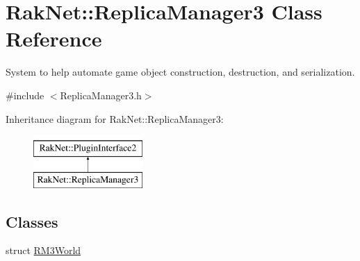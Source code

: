 \hypertarget{class_rak_net_1_1_replica_manager3}{\section{Rak\-Net\-:\-:Replica\-Manager3 Class Reference}
\label{class_rak_net_1_1_replica_manager3}
}


System to help automate game object construction, destruction, and serialization.  




{\ttfamily \#include $<$Replica\-Manager3.\-h$>$}

Inheritance diagram for Rak\-Net\-:\-:Replica\-Manager3\-:\begin{figure}[H]
\begin{center}
\leavevmode
\includegraphics[height=2.000000cm]{class_rak_net_1_1_replica_manager3}
\end{center}
\end{figure}
\subsection*{Classes}
\begin{DoxyCompactItemize}
\item 
struct \hyperlink{struct_rak_net_1_1_replica_manager3_1_1_r_m3_world}{R\-M3\-World}
\end{DoxyCompactItemize}
